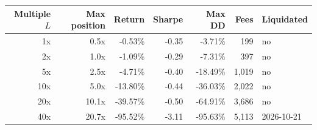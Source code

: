 \begin{tabular}{rrrrrrl}
\toprule
Multiple $L$ & Max position & Return & Sharpe & Max DD & Fees & Liquidated \\
\midrule
1x & 0.5x & -0.53\% & -0.35 & -3.71\% & 199 & no \\
2x & 1.0x & -1.09\% & -0.29 & -7.31\% & 397 & no \\
5x & 2.5x & -4.71\% & -0.40 & -18.49\% & 1,019 & no \\
10x & 5.0x & -13.80\% & -0.44 & -36.03\% & 2,022 & no \\
20x & 10.1x & -39.57\% & -0.50 & -64.91\% & 3,686 & no \\
40x & 20.7x & -95.52\% & -3.11 & -95.63\% & 5,113 & 2026-10-21 \\
\bottomrule
\end{tabular}
